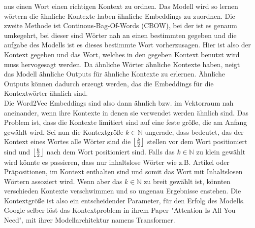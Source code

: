 \documentclass[12pt,letterpaper,ngerman]{article}
\begin{document}
aus einen Wort einen richtigen Kontext zu ordnen. Das Modell wird so lernen
wörtern die ähnliche Kontexte haben ähnliche Embeddings zu zuordnen. Die
zweite Methode ist Continous-Bag-Of-Words (CBOW), bei der ist es genaum
umkegehrt, bei dieser sind Wörter nah an einen bestimmten gegeben und
die aufgabe des Modells ist es dieses bestimmte Wort vorherzusagen.
Hier ist also der Kontext gegeben und das Wort, welches
in den gegeben Kontext benutzt wird muss hervogesagt werden. Da ähnliche
Wörter ähnliche Kontexte haben, neigt das Modell ähnliche 
Outputs für ähnliche Kontexte zu erlernen. Ähnliche Outputs 
können dadurch erzeugt werden, das die Embeddings für die
Kontextwörter ähnlich sind.\\
Die Word2Vec Embeddings sind also dann ähnlich bzw. 
im Vektorraum nah aneinander, wenn ihre Kontexte in denen sie
verwendet werden ähnlich sind. Das Problem ist, dass die Kontexte
limitiert sind auf eine feste größe, die am Anfang gewählt wird.
Sei nun die Kontextgröße $k \in \mathbb{N}$ ungerade, dass bedeutet, das der Kontext
eines Wortes alle Wörter sind die $\floor*{\frac{k}{2}}$ stellen vor dem Wort
positioniert sind und $\floor*{\frac{k}{2}}$ nach dem Wort positioniert sind.
Falls das $k \in \mathbb{N}$ zu klein gewählt wird könnte es passieren, dass
nur inhaltslose Wörter wie z.B. Artikel oder Präpositionen, im
Kontext enthalten sind und somit das Wort mit Inhaltslosen
Wörtern assoziert wird. Wenn aber das $k \in \mathbb{N}$ zu breit
gewählt ist, könnten verschieden Kontexte verschwimmen und so
ungenau Ergebnisse enstehen. Die Kontextgröße ist also ein
entscheidender Parameter, für den Erfolg des Modells. Google selber löst
das Kontextproblem in ihrem Paper "Attention Is All You Need",
mit ihrer Modellarchitektur namens Transformer.
\end{document}
